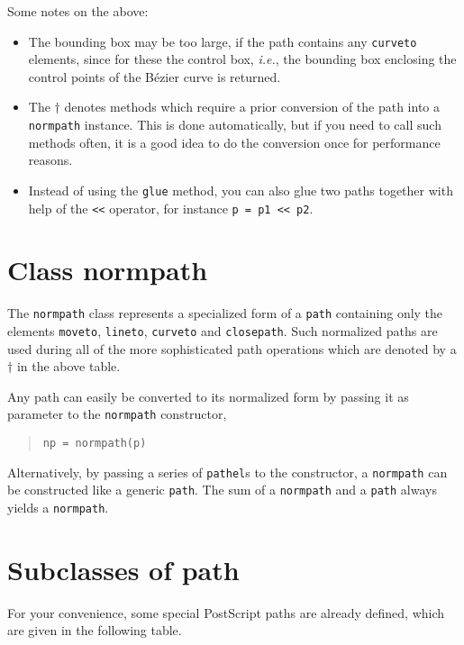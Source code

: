 Some notes on the above:
\begin{itemize}
\item The bounding box may be too large, if the path contains any
  \texttt{curveto} elements, since for these the control box,
  \textit{i.e.}, the bounding box enclosing the control points of
  the B\'ezier curve is returned.
\item The $\dagger$ denotes methods which require a prior
  conversion of the path into a \verb|normpath| instance. This is
  done automatically, but if you need to call such methods often,
  it is a good idea to do the conversion once for performance reasons.
\item Instead of using the \verb|glue| method, you can also glue two
paths together with help of the \verb|<<| operator, for instance
\verb|p = p1 << p2|.
\end{itemize}

\section{Class normpath}

The \texttt{normpath} class represents a specialized form of a
\texttt{path} containing only the elements \verb|moveto|,
\verb|lineto|, \verb|curveto| and \verb|closepath|. Such normalized
paths are used during all of the more sophisticated path operations
which are denoted by a $\dagger$ in the above table.


Any path can
easily be converted to its normalized form by passing it as parameter
to the \texttt{normpath} constructor,
\begin{quote}
\begin{verbatim}
np = normpath(p)
\end{verbatim}
\end{quote}
Alternatively, by passing a series of \texttt{pathel}s to the constructor, a
\texttt{normpath} can be constructed like a generic \texttt{path}.
The sum of a \verb|normpath| and a \verb|path| always yields a
\verb|normpath|.

\section{Subclasses of path}

For your convenience, some special PostScript paths are already defined, which
are given in the following table.

